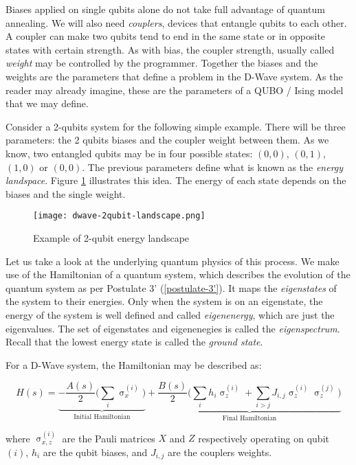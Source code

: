 Biases applied on single qubits alone do not take full advantage of quantum annealing. We will also need \emph{couplers}, devices that entangle qubits to each other. A coupler can make two qubits tend to end in the same state or in opposite states with certain strength. As with bias, the coupler strength, usually called \emph{weight}  may be controlled by the programmer. Together the biases and the weights are the parameters that define a problem in the D-Wave system. As the reader may already imagine, these are the parameters of a QUBO / Ising model that we may define.

Consider a 2-qubits system for the following simple example. There will be three parameters: the 2 qubits biases and the coupler weight between them. As we know, two entangled qubits may be in four possible states: $(0,0)$, $(0,1)$, $(1,0)$ or $(0,0)$. The previous parameters define what is known as the \emph{energy landspace}. Figure \ref{fig:dwave-2qubit-landscape} illustrates this idea. The energy of each state depends on the biases and the single weight.

\begin{figure}[h]
	\texttt{[image: dwave-2qubit-landscape.png]}
	\centering
	\caption{Example of 2-qubit energy landscape \cite{DWaveDoc-QuantumAnnealing}}
	\label{fig:dwave-2qubit-landscape}
\end{figure}

Let us take a look at the underlying quantum physics of this process. We make use of the Hamiltonian of a quantum system, which describes the evolution of the quantum system as per Postulate 3' (\ref{postulate-3'}). It maps the \emph{eigenstates} of the system to their energies. Only when the system is on an eigenstate, the energy of the system is well defined and called \emph{eigenenergy}, which are just the eigenvalues. The set of eigenstates and eigenenegies is called the \emph{eigenspectrum}. Recall that the lowest energy state is called the \emph{ground state}.

For a D-Wave system, the Hamiltonian may be described as:

$$ H(s) = \underbrace{- \frac{A(s)}{2} \bigg( \sum_i \upsigma_x^{(i)} \bigg)}_\text{Initial Hamiltonian} 
			+ \underbrace{\frac{B(s)}{2} \bigg( \sum_i h_i \upsigma_z^{(i)} + \sum_ {i > j} J_{i,j} \upsigma_z^{(i)} \upsigma_z^{(j)} \bigg)}_\text{Final Hamiltonian} $$

where $\upsigma^{(i)}_{x,z}$ are the Pauli matrices $X$ and $Z$ respectively operating on qubit $(i)$, $h_i$ are the qubit biases, and $J_{i,j}$ are the couplers weights.


